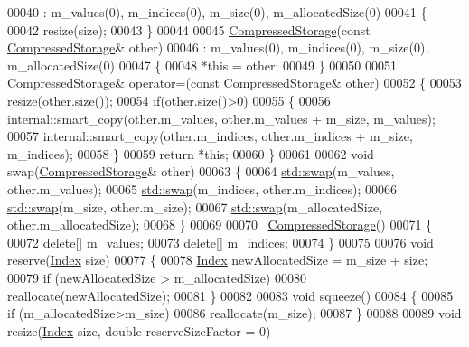 \begin{DoxyCode}
00040       : m\_values(0), m\_indices(0), m\_size(0), m\_allocatedSize(0)
00041     \{
00042       resize(size);
00043     \}
00044 
00045     \hyperlink{class_eigen_1_1internal_1_1_compressed_storage}{CompressedStorage}(\textcolor{keyword}{const} \hyperlink{class_eigen_1_1internal_1_1_compressed_storage}{CompressedStorage}& other)
00046       : m\_values(0), m\_indices(0), m\_size(0), m\_allocatedSize(0)
00047     \{
00048       *\textcolor{keyword}{this} = other;
00049     \}
00050 
00051     \hyperlink{class_eigen_1_1internal_1_1_compressed_storage}{CompressedStorage}& operator=(\textcolor{keyword}{const} \hyperlink{class_eigen_1_1internal_1_1_compressed_storage}{CompressedStorage}& other)
00052     \{
00053       resize(other.size());
00054       \textcolor{keywordflow}{if}(other.size()>0)
00055       \{
00056         internal::smart\_copy(other.m\_values,  other.m\_values  + m\_size, m\_values);
00057         internal::smart\_copy(other.m\_indices, other.m\_indices + m\_size, m\_indices);
00058       \}
00059       \textcolor{keywordflow}{return} *\textcolor{keyword}{this};
00060     \}
00061 
00062     \textcolor{keywordtype}{void} swap(\hyperlink{class_eigen_1_1internal_1_1_compressed_storage}{CompressedStorage}& other)
00063     \{
00064       \hyperlink{endian_8c_a3ca5ecd34b04d6a243c054ac3a57f68d}{std::swap}(m\_values, other.m\_values);
00065       \hyperlink{endian_8c_a3ca5ecd34b04d6a243c054ac3a57f68d}{std::swap}(m\_indices, other.m\_indices);
00066       \hyperlink{endian_8c_a3ca5ecd34b04d6a243c054ac3a57f68d}{std::swap}(m\_size, other.m\_size);
00067       \hyperlink{endian_8c_a3ca5ecd34b04d6a243c054ac3a57f68d}{std::swap}(m\_allocatedSize, other.m\_allocatedSize);
00068     \}
00069 
00070     ~\hyperlink{class_eigen_1_1internal_1_1_compressed_storage}{CompressedStorage}()
00071     \{
00072       \textcolor{keyword}{delete}[] m\_values;
00073       \textcolor{keyword}{delete}[] m\_indices;
00074     \}
00075 
00076     \textcolor{keywordtype}{void} reserve(\hyperlink{namespace_eigen_a62e77e0933482dafde8fe197d9a2cfde}{Index} size)
00077     \{
00078       \hyperlink{namespace_eigen_a62e77e0933482dafde8fe197d9a2cfde}{Index} newAllocatedSize = m\_size + size;
00079       \textcolor{keywordflow}{if} (newAllocatedSize > m\_allocatedSize)
00080         reallocate(newAllocatedSize);
00081     \}
00082 
00083     \textcolor{keywordtype}{void} squeeze()
00084     \{
00085       \textcolor{keywordflow}{if} (m\_allocatedSize>m\_size)
00086         reallocate(m\_size);
00087     \}
00088 
00089     \textcolor{keywordtype}{void} resize(\hyperlink{namespace_eigen_a62e77e0933482dafde8fe197d9a2cfde}{Index} size, \textcolor{keywordtype}{double} reserveSizeFactor = 0)

\end{DoxyCode}
